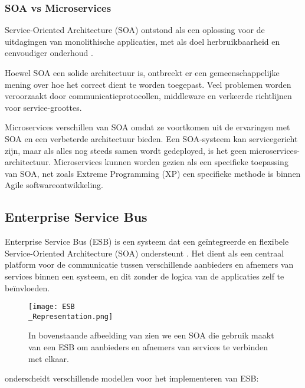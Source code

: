 \subsubsection{SOA vs Microservices}

Service-Oriented Architecture (SOA) ontstond als een oplossing voor de uitdagingen van monolithische applicaties, met als doel herbruikbaarheid en eenvoudiger onderhoud \autocite{Newman2021}.

Hoewel SOA een solide architectuur is, ontbreekt er een gemeenschappelijke mening over hoe het correct dient te worden toegepast. Veel problemen worden veroorzaakt door communicatieprotocollen, middleware en verkeerde richtlijnen voor service-groottes.

Microservices verschillen van SOA omdat ze voortkomen uit de ervaringen met SOA en een verbeterde architectuur bieden. Een SOA-systeem kan servicegericht zijn, maar als alles nog steeds samen wordt gedeployed, is het geen microservices-architectuur. Microservices kunnen worden gezien als een specifieke toepassing van SOA, net zoals Extreme Programming (XP) een specifieke methode is binnen Agile softwareontwikkeling.

\subsection{Enterprise Service Bus}
\label{sec:ESB}

Enterprise Service Bus (ESB) is een systeem dat een geïntegreerde en flexibele Service-Oriented Architecture (SOA) ondersteunt \autocite{Gaol2023}. Het dient als een centraal platform voor de communicatie tussen verschillende aanbieders en afnemers van services binnen een systeem, en dit zonder de logica van de applicaties zelf te beïnvloeden.\newline

\begin{figure}[H]
	\centering
	\texttt{[image: ESB\\\_Representation.png]}
	\caption[Voorstelling van een Enterprise-Service Bus]{\label{fig:ESB_Representation}In bovenstaande afbeelding van \textcite{Megargel2021} zien we een  SOA die gebruik maakt van een ESB om aanbieders en afnemers van services te verbinden met elkaar.}
\end{figure}

\textcite{Gaol2023} onderscheidt verschillende modellen voor het implementeren van ESB:

